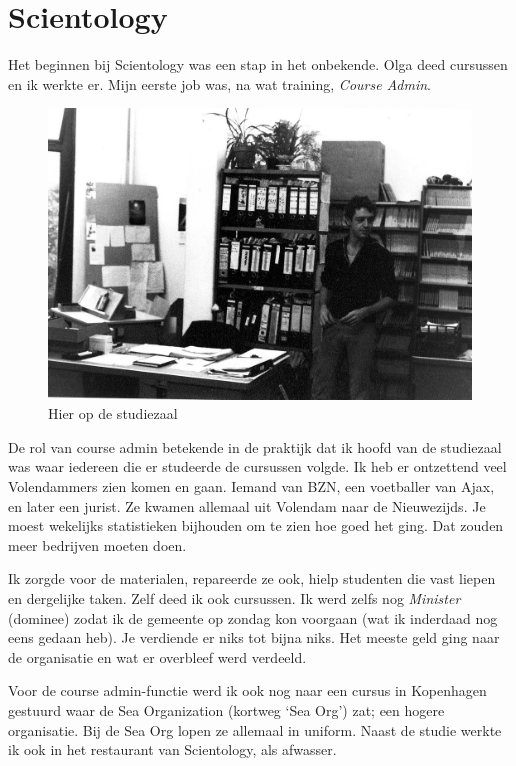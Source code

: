 \documentclass[10pt,twoside, openright]{memoir}
\begin{document}
\chapter{Scientology} %
\label{cha:scientologu}

Het beginnen bij Scientology was een stap in het onbekende. Olga deed cursussen en ik werkte er. Mijn eerste job was, na wat training, \emph{Course Admin}. 

\begin{figure}
\includegraphics[width=\textwidth]{img/ch44/NZVBwal_0006}
\caption*{\footnotesize Hier op de studiezaal}
\end{figure}

De rol van course admin betekende in de praktijk dat ik hoofd van de studiezaal was waar iedereen die er studeerde de cursussen volgde. Ik heb er ontzettend veel Volendammers zien komen en gaan. Iemand van BZN, een voetballer van Ajax, en later een jurist. Ze kwamen allemaal uit Volendam naar de Nieuwezijds. Je moest wekelijks statistieken bijhouden om te zien hoe goed het ging. Dat zouden meer bedrijven moeten doen.

Ik zorgde voor de materialen, repareerde ze ook, hielp studenten die vast liepen en dergelijke taken. Zelf deed ik ook cursussen. Ik werd zelfs nog \emph{Minister} (dominee) zodat ik de gemeente op zondag kon voorgaan (wat ik inderdaad nog eens gedaan heb). Je verdiende er niks tot bijna niks. Het meeste geld ging naar de organisatie en wat er overbleef werd verdeeld. 

Voor de course admin-functie werd ik ook nog naar een cursus in Kopenhagen gestuurd waar de Sea Organization (kortweg `Sea Org') zat; een hogere organisatie. Bij de Sea Org lopen ze allemaal in uniform. Naast de studie werkte ik ook in het restaurant van Scientology, als afwasser.
\end{document}
